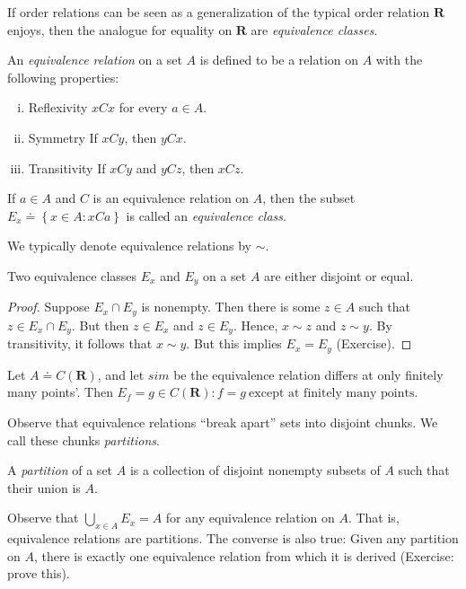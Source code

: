 If order relations can be seen as a generalization of the typical order relation
$\mathbf{R}$ enjoys, then the analogue for equality on $\mathbf{R}$ are \emph{equivalence
classes}.
\begin{definition}
	An \emph{equivalence relation} on a set $A$ is defined to be a relation on $A$
	with the following properties:
	\begin{enumerate}[(i)]
		\item{Reflexivity} $xCx$ for every $a \in A$.
		\item{Symmetry} If $xCy$, then $yCx$.
		\item{Transitivity} If $xCy$ and $yCz$, then $xCz$.
	\end{enumerate}
	If $a \in A$ and $C$ is an equivalence relation on $A$, then
	the subset $E_{x} \doteq \left\{ x \in A: xCa  \right\}$ is called
	an \emph{equivalence class}.

	We typically denote equivalence relations by $\sim$.
\end{definition}
\begin{lemma}\label{lem:}
	Two equivalence classes $E_{x}$ and $E_{y}$ on a set $A$ are
	either disjoint or equal.
\end{lemma}
\begin{proof}
	Suppose $E_{x} \cap E_{y}$ is nonempty. Then there is some $z \in A$
	such that $z \in E_{x} \cap E_{y}$. But then $z \in E_{x}$ and
	$z \in E_{y}$. Hence, $x \sim z$ and $z \sim y$. By transitivity, it follows
	that $x \sim y$. But this implies $E_{x} = E_{y}$ (Exercise).
\end{proof}
\begin{example}
	Let $A \doteq C(\mathbf{R})$, and let $sim$ be the equivalence relation differs at
	only finitely many points'. Then $E_{f} = {g \in C(\mathbf{R}): f=g \ \text{except at
	finitely many points}}$.
\end{example}
Observe that equivalence relations ``break apart'' sets into disjoint chunks. We call
these chunks \emph{partitions}.
\begin{definition}
	A \emph{partition} of a set $A$  is a collection of disjoint nonempty subsets of
	$A$ such that their union is $A$.
\end{definition}
Observe that $\bigcup_{x \in A}  E_{x}  = A$ for any equivalence relation on
$A$. That is, equivalence relations are partitions. The converse is also true:
Given any partition on $A$, there is exactly one equivalence relation from
which it is derived (Exercise: prove this).

